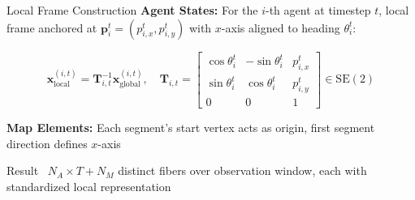\documentclass[10pt,aspectratio=169]{beamer}
\begin{document}
\begin{frame}{Local Frame Construction}
\textbf{Agent States:} For the $i$-th agent at timestep $t$, local frame anchored at $\mathbf{p}_i^t = (p_{i,x}^t, p_{i,y}^t)$ with $x$-axis aligned to heading $\theta_i^t$:

\begin{equation}
\mathbf{x}^{(i,t)}_{\text{local}} = \mathbf{T}_{i,t}^{-1} \mathbf{x}_{\text{global}}^{(i,t)}, \quad
\mathbf{T}_{i,t} = \begin{bmatrix}
\cos\theta_i^t & -\sin\theta_i^t & p_{i,x}^t \\
\sin\theta_i^t & \cos\theta_i^t & p_{i,y}^t \\
0 & 0 & 1
\end{bmatrix} \in \mathrm{SE}(2)
\end{equation}

\vspace{0.3cm}

\textbf{Map Elements:} Each segment's start vertex acts as origin, first segment direction defines $x$-axis

\begin{block}{Result~\cite{qcnetZhou2023}}
$N_{A} \times T + N_M$ distinct fibers over observation window, each with standardized local representation
\end{block}
\end{frame}
\end{document}
